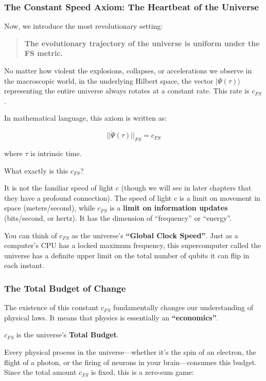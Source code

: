 \subsubsection{The Constant Speed Axiom: The Heartbeat of the Universe}

Now, we introduce the most revolutionary setting:

\begin{quote}
\textbf{The evolutionary trajectory of the universe is uniform under the FS metric.}
\end{quote}

No matter how violent the explosions, collapses, or accelerations we observe in the macroscopic world, in the underlying Hilbert space, the vector $|\Psi(\tau)\rangle$ representing the entire universe always rotates at a constant rate. This rate is \textbf{$c_{FS}$}.

In mathematical language, this axiom is written as:

\[||\dot{\Psi}(\tau)||_{FS} = c_{FS}\]

where $\tau$ is intrinsic time.

What exactly is this \textbf{$c_{FS}$}?

It is not the familiar speed of light $c$ (though we will see in later chapters that they have a profound connection). The speed of light $c$ is a limit on movement in space (meters/second), while $c_{FS}$ is a \textbf{limit on information updates} (bits/second, or hertz). It has the dimension of ``frequency'' or ``energy''.

You can think of $c_{FS}$ as the universe's \textbf{``Global Clock Speed''}. Just as a computer's CPU has a locked maximum frequency, this supercomputer called the universe has a definite upper limit on the total number of qubits it can flip in each instant.

\subsubsection{The Total Budget of Change}

The existence of this constant $c_{FS}$ fundamentally changes our understanding of physical laws. It means that physics is essentially an \textbf{``economics''}.

$c_{FS}$ is the universe's \textbf{Total Budget}.

Every physical process in the universe---whether it's the spin of an electron, the flight of a photon, or the firing of neurons in your brain---consumes this budget. Since the total amount $c_{FS}$ is fixed, this is a zero-sum game:

